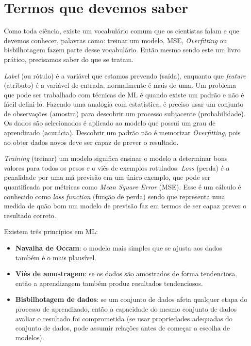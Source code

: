 \section{Termos que devemos saber}
Como toda ciência, existe um vocabulário comum que os cientistas falam e que devemos conhecer, palavras como: treinar um modelo, MSE, \textit{Overfitting} ou bisbilhotagem fazem parte desse vocabulário. Então mesmo sendo este um livro prático, precisamos saber do que se tratam.

\textit{Label} (ou rótulo) é a variável que estamos prevendo (saída), enquanto que \textit{feature} (atributo) é a variável de entrada, normalmente é mais de uma. Um problema que pode ser trabalhado com técnicas de ML é quando existe um padrão e não é fácil defini-lo. Fazendo uma analogia com estatística, é preciso usar um conjunto de observações (amostra) para descobrir um processo subjacente (probabilidade). Os dados são selecionados é aplicado ao modelo que possui um grau de aprendizado (acurácia). Descobrir um padrão não é memorizar \textit{Overfitting}, pois ao obter dados novos deve ser capaz de prever o resultado. 

\textit{Training} (treinar) um modelo significa ensinar o modelo a determinar bons valores para todos os pesos e o viés de exemplos rotulados. \textit{Loss} (perda) é a penalidade por uma má previsão em um único exemplo, que pode ser quantificada por métricas como \textit{Mean Square Error} (MSE). Esse é um cálculo é conhecido como \textit{loss function} (função de perda) sendo que representa uma medida de quão bom um modelo de previsão faz em termos de ser capaz prever o resultado correto.

Existem três princípios em ML: \vspace{-1em}
\begin{itemize}
	\item \textbf{Navalha de Occam}: o modelo mais simples que se ajusta aos dados também é o mais plausível.
	\item \textbf{Viés de amostragem}: se os dados são amostrados de forma tendenciosa, então a aprendizagem também produz resultados tendenciosos.
	\item \textbf{Bisbilhotagem de dados}: se um conjunto de dados afeta qualquer etapa do processo de aprendizado, então a capacidade do mesmo conjunto de dados avaliar o resultado foi comprometida (se usar propriedades adequadas do conjunto de dados, pode assumir relações antes de começar a escolha de modelos).
\end{itemize}

